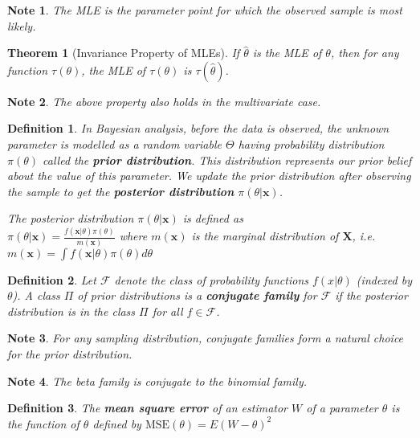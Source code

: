 \documentclass[14pt,twoside]{extreport}
\theoremstyle{dotless}
\newtheorem*{defn}{Definition}
\newtheorem*{thm}{Theorem} %
\newtheorem*{note}{Note} %
\begin{document}
\begin{note}
    The MLE is the parameter point for which the observed sample is most likely.
\end{note}

\begin{thm}[Invariance Property of MLEs]
    If $\hat{\theta}$ is the MLE of $\theta$, then for any function $\tau(\theta)$, the MLE of $\tau(\theta)$ is $\tau(\hat{\theta})$.
\end{thm}

\begin{note}
    The above property also holds in the multivariate case.
\end{note}

\begin{defn}
    In Bayesian analysis, before the data is observed, the unknown parameter is modelled as a random variable $\Theta$ having probability distribution $\pi(\theta)$ called the \textbf{prior distribution}. This distribution represents our prior belief about the value of this parameter. We update the prior distribution after observing the sample to get the \textbf{posterior distribution} $\pi(\theta|\bm{x})$.

    The posterior distribution $\pi(\theta|\bm{x})$ is defined as 
    \\ $\pi(\theta|\bm{x}) = \frac{f(\bm{x}|\theta) \pi(\theta) }{m(\bm{x})}$ where $m(\bm{x})$ is the marginal distribution of $\bm{X}$, i.e. $m(\bm{x}) = \int f(\bm{x} | \theta) \pi(\theta) d\theta$
\end{defn}

\begin{defn}
    Let $\mathcal{F}$ denote the class of probability functions $f(x|\theta)$ (indexed by $\theta$). A class $\Pi$ of prior distributions is a \textbf{conjugate family} for $\mathcal{F}$ if the posterior distribution is in the class $\Pi$ for all $f \in \mathcal{F}$.
\end{defn}

\begin{note}
    For any sampling distribution, conjugate families form a natural choice for the prior distribution.
\end{note}

\begin{note}
    The beta family is conjugate to the binomial family.
\end{note}

\begin{defn}
    The \textbf{mean square error} of an estimator $W$ of a parameter $\theta$ is the function of $\theta$ defined by $\text{MSE}(\theta) = E(W - \theta)^2$
\end{defn}
\end{document}
